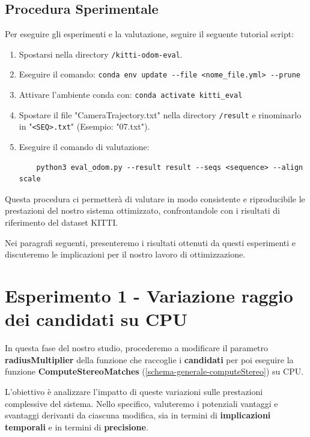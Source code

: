\documentclass[12pt,a4paper]{report}
\begin{document}
\subsection{Procedura Sperimentale}

Per eseguire gli esperimenti e la valutazione, seguire il seguente tutorial script:

\begin{enumerate}
    \item Spostarsi nella directory \texttt{/kitti-odom-eval}.
    \item Eseguire il comando: \verb|conda env update --file <nome_file.yml> --prune|
    \item Attivare l'ambiente conda con: \verb|conda activate kitti_eval|
    \item Spostare il file "CameraTrajectory.txt" nella directory \texttt{/result} e rinominarlo in "\texttt{<SEQ>.txt}" (Esempio: "07.txt").
    \item Eseguire il comando di valutazione: 
    \begin{verbatim}
    python3 eval_odom.py --result result --seqs <sequence> --align scale
    \end{verbatim}
\end{enumerate}

Questa procedura ci permetterà di valutare in modo consistente e riproducibile le prestazioni del nostro sistema ottimizzato, confrontandole con i risultati di riferimento del dataset KITTI.

Nei paragrafi seguenti, presenteremo i risultati ottenuti da questi esperimenti e discuteremo le implicazioni per il nostro lavoro di ottimizzazione.

\newpage
\section{Esperimento 1 - Variazione raggio dei candidati su CPU}

In questa fase del nostro studio, procederemo a modificare il parametro \textbf{radiusMultiplier}  della funzione che raccoglie i \textbf{candidati} per poi eseguire la funzione \textbf{ComputeStereoMatches} (\ref{schema-generale-computeStereo}) su CPU. 

L'obiettivo è analizzare l'impatto di queste variazioni sulle prestazioni complessive del sistema. Nello specifico, valuteremo i potenziali vantaggi e svantaggi derivanti da ciascuna modifica, sia in termini di \textbf{implicazioni temporali} e in termini di \textbf{precisione}.
\end{document}
